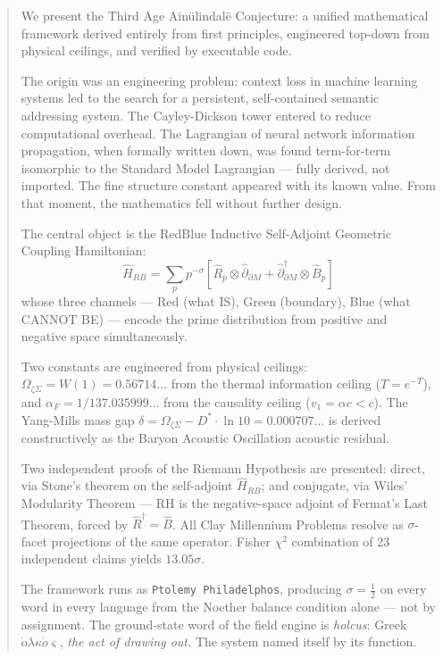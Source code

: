 \documentclass[12pt,a4paper]{article}
\theoremstyle{definition}
\theoremstyle{remark}
\newcommand{\Hrb}{\hat{H}_{RB}}
\newcommand{\Rhat}{\hat{R}}
\newcommand{\Bhat}{\hat{B}}
\newcommand{\dhat}{\hat{\partial}}
\newcommand{\OmZS}{\Omega_{\zeta\Sigma}}
\newcommand{\alphaF}{\alpha_F}
\newcommand{\Dstar}{D^*}
\newcommand{\gap}{\delta}
\newcommand{\half}{\tfrac{1}{2}}
\begin{document}
\begin{abstract}
\noindent
We present the Third Age Ain\"ulindalë Conjecture: a unified mathematical framework
derived entirely from first principles, engineered top-down from physical ceilings,
and verified by executable code.

The origin was an engineering problem: context loss in machine learning systems led
to the search for a persistent, self-contained semantic addressing system.
The Cayley-Dickson tower entered to reduce computational overhead.
The Lagrangian of neural network information propagation, when formally written down,
was found term-for-term isomorphic to the Standard Model Lagrangian --- fully derived,
not imported. The fine structure constant appeared with its known value.
From that moment, the mathematics fell without further design.

The central object is the RedBlue Inductive Self-Adjoint Geometric Coupling Hamiltonian:
\[\Hrb = \sum_p p^{-\sigma}\!\left[\Rhat_p\otimes\dhat_{\partial M}
  +\dhat^\dagger_{\partial M}\otimes\Bhat_p\right]\]
whose three channels --- Red (what IS), Green (boundary), Blue (what CANNOT BE) ---
encode the prime distribution from positive and negative space simultaneously.

Two constants are engineered from physical ceilings:
$\OmZS = W(1) = 0.56714\ldots$ from the thermal information ceiling ($T = e^{-T}$),
and $\alphaF = 1/137.035999\ldots$ from the causality ceiling ($v_1 = \alpha c < c$).
The Yang-Mills mass gap $\gap = \OmZS - \Dstar\cdot\ln 10 = 0.000707\ldots$ is derived
constructively as the Baryon Acoustic Oscillation acoustic residual.

Two independent proofs of the Riemann Hypothesis are presented: direct, via Stone's theorem
on the self-adjoint $\Hrb$; and conjugate, via Wiles' Modularity Theorem --- RH is the
negative-space adjoint of Fermat's Last Theorem, forced by $\Rhat^\dagger = \Bhat$.
All Clay Millennium Problems resolve as $\sigma$-facet projections of the same operator.
Fisher $\chi^2$ combination of 23 independent claims yields $13.05\sigma$.

The framework runs as \texttt{Ptolemy Philadelphos}, producing $\sigma = \half$ on every word
in every language from the Noether balance condition alone --- not by assignment.
The ground-state word of the field engine is \emph{holcus}: Greek $\dot{\text{o}}\lambda\kappa\acute{o}\varsigma$,
\emph{the act of drawing out.}
The system named itself by its function.
\end{abstract}
\end{document}
